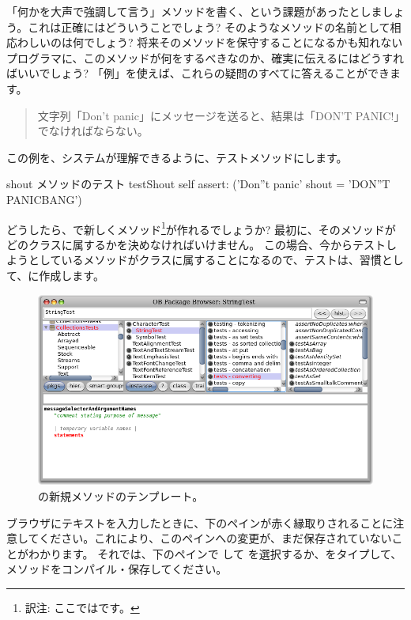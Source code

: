\documentclass[a4paper,10pt,twoside]{book}
\begin{document}
「何かを大声で強調して言う」メソッドを書く、という課題があったとしましょう。これは正確にはどういうことでしょう? そのようなメソッドの名前として相応わしいのは何でしょう? 将来そのメソッドを保守することになるかも知れないプログラマに、このメソッドが何をするべきなのか、確実に伝えるにはどうすればいいでしょう? 「例」を使えば、これらの疑問のすべてに答えることができます。

\begin{quote}
文字列「Don't panic」にメッセージを送ると、結果は「DON'T PANIC!」でなければならない。
\end{quote}

\noindent
この例を、システムが理解できるように、テストメソッドにします。

\begin{method}[testShout]{shout メソッドのテスト}
testShout
	self assert: ('Don''t panic' shout = 'DON''T PANICBANG')
\end{method} %

どうしたら、\pharo で新しくメソッド\footnote{訳注: ここではです。}が作れるでしょうか? 最初に、そのメソッドがどのクラスに属するかを決めなければいけません。
この場合、今からテストしようとしているメソッドがクラスに属することになるので、テストは、習慣として、に作成します。

\begin{figure}[hbt]
\centerline {\includegraphics[width=\textwidth]{StringTest-newMethodTemplate}}
\caption{の新規メソッドのテンプレート。
}
\end{figure}

ブラウザにテキストを入力したときに、下のペインが赤く縁取りされることに注意してください。これにより、このペインへの変更が、まだ保存されていないことがわかります。
それでは、下のペインで \actclick して を選択するか、をタイプして、メソッドをコンパイル・保存してください。
\end{document}
